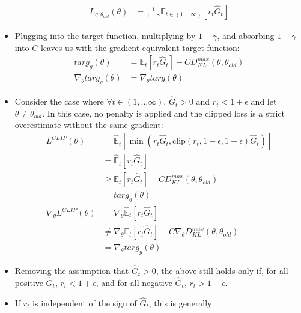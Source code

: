 \documentclass[a4paper]{article}
\begin{document}
\begin{itemize}
        \begin{align*}
            L_{g, \theta_{old}}(\theta) &= \frac{1}{1 - \gamma}
            \mathbb{E}_{t \in (1, \dots \infty)}
            \left[ r_{t} \hat{G}_t \right]
        \end{align*}
    \item Plugging into the target function, multiplying by $1 - \gamma$, and
        absorbing $1 - \gamma$ into $C$ leaves us with the
        gradient-equivalent target function:
    \begin{align*}
        targ_{g}(\theta) &= 
            \mathbb{E}_{t}
            \left[ r_{t} \hat{G}_t \right] 
            - CD_{KL}^{max}(\theta, \theta_{old})\\
            \nabla_{\theta} targ_{g}(\theta) &= \nabla_{\theta} targ(\theta) 
    \end{align*}
    \item Consider the case where $\forall t \in (1, \dots \infty)$, $\hat{G}_t
        > 0$ and $r_t < 1 + \epsilon$ and let $\theta \ne \theta_{old}$. In
        this case, no penalty is applied and the clipped loss is a strict
        overestimate without the same gradient:
    \begin{align*}
        L^{CLIP}(\theta) &= \hat{\mathbb{E}}_{t}\left[ 
        \min\left(r_t\hat{G}_t, \text{clip}
        (r_t, 1 - \epsilon, 1 + \epsilon)\hat{G}_t\right) \right]\\
        &= \hat{\mathbb{E}}_{t}\left[ 
        r_t\hat{G}_t\right]\\
        &\ge \mathbb{E}_{t}
            \left[ r_{t} \hat{G}_t \right] 
            - CD_{KL}^{max}(\theta, \theta_{old})\\
        &= targ_{g}(\theta)\\
        \nabla_{\theta}L^{CLIP}(\theta) &= \nabla_{\theta}
        \hat{\mathbb{E}}_{t}\left[r_t\hat{G}_t\right]\\
        &\ne \nabla_{\theta}\mathbb{E}_{t}
            \left[ r_{t} \hat{G}_t \right] 
            - C\nabla_{\theta}D_{KL}^{max}(\theta, \theta_{old})\\
        &= \nabla_{\theta}targ_{g}(\theta)
    \end{align*}
    \item Removing the assumption that $\hat{G}_t > 0$, the above still holds
        only if, for all positive $\hat{G}_t$, $r_t < 1 + \epsilon$, and for
        all negative $\hat{G}_t$, $r_t > 1 - \epsilon$. 
    \item If $r_t$ is independent of the sign of $\hat{G}_t$, this is generally

\end{itemize}
\end{document}
